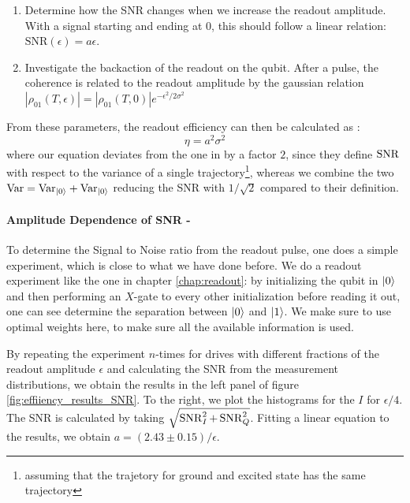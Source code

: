 \begin{enumerate}
    \item Determine how the SNR changes when we increase the readout amplitude. With a signal starting and ending at 0, this should follow a linear relation: $\text{SNR}(\epsilon) = a \epsilon$.
    \item Investigate the backaction of the readout on the qubit. After a pulse, the coherence is related to the readout amplitude by the gaussian relation $|\rho_{01}(T, \epsilon)| = |\rho_{01}(T, 0)|e^{-\epsilon^2/2\sigma^2}$
\end{enumerate}
From these parameters, the readout efficiency can then be calculated as \cite{bultink_general_2018}:
\begin{equation}
    \eta = a^2\sigma^2
\end{equation}
where our equation deviates from the one in \cite{bultink_general_2018} by a factor $2$, since they define $\operatorname{SNR}$ with respect to the variance of a single trajectory\footnote{assuming that the trajetory for ground and excited state has the same trajectory}, whereas we combine the two $\text{Var} = \text{Var}_{\ket{0}} + \text{Var}_{\ket{0}}$ reducing the SNR with $1/\sqrt{2}$ compared to their definition.

\paragraph{Amplitude Dependence of SNR - }
To determine the Signal to Noise ratio from the readout pulse, one does a simple experiment, which is close to what we have done before. We do a readout experiment like the one in chapter \ref{chap:readout}: by initializing the qubit in $\ket{0}$ and then performing an $X$-gate to every other initialization before reading it out, one can see determine the separation between $\ket{0}$ and $\ket{1}$. We make sure to use optimal weights here, to make sure all the available information is used.


By repeating the experiment $n$-times for drives with different fractions of the readout amplitude $\epsilon$ and calculating the SNR from the measurement distributions, we obtain the results in the left panel of figure \ref{fig:effiiency_results_SNR}. To the right, we plot the histograms for the $I$ for $\epsilon / 4$. The SNR is calculated by taking $\sqrt{\operatorname{SNR}_I^2 + \operatorname{SNR}_Q^2}$. Fitting a linear equation to the results, we obtain $a = (2.43 \pm 0.15) / \epsilon$. 

